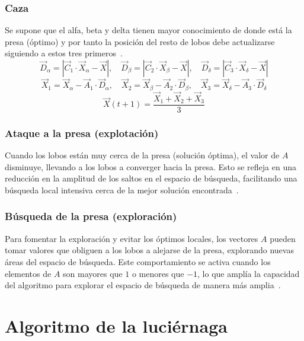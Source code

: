 \subsubsection{Caza}
Se supone que el alfa, beta y delta tienen mayor conocimiento de donde está la presa (óptimo) y por tanto la posición del resto de lobos debe actualizarse siguiendo a estos tres primeros~\cite{mirjalili_grey_2014}.
\begin{equation}
    \vec{D}_{\alpha}=|\vec{C}_1\cdot\vec{X}_{\alpha}-\vec{X}|,\quad \vec{D}_{\beta}=|\vec{C}_2\cdot\vec{X}_{\beta}-\vec{X}|,\quad \vec{D}_{\delta}=|\vec{C}_3\cdot\vec{X}_{\delta}-\vec{X}|
\end{equation}
\begin{equation}
    \vec{X}_1=\vec{X}_{\alpha}-\vec{A}_1\cdot\vec{D}_{\alpha},\quad \vec{X}_2=\vec{X}_{\beta}-\vec{A}_2\cdot\vec{D}_{\beta},\quad \vec{X}_3=\vec{X}_{\delta}-\vec{A}_3\cdot\vec{D}_{\delta}
\end{equation}
\begin{equation}
    \vec{X}(t+1)=\frac{\vec{X}_1+\vec{X}_2+\vec{X}_3}{3}
\end{equation}

\subsubsection{Ataque a la presa (explotación)}
Cuando los lobos están muy cerca de la presa (solución óptima), el valor de $A$ disminuye, llevando a los lobos a converger hacia la presa. Esto se refleja en una reducción en la amplitud de los saltos en el espacio de búsqueda, facilitando una búsqueda local intensiva cerca de la mejor solución encontrada~\cite{mirjalili_grey_2014}.

\subsubsection{Búsqueda de la presa (exploración)}
Para fomentar la exploración y evitar los óptimos locales, los vectores $A$ pueden tomar valores que obliguen a los lobos a alejarse de la presa, explorando nuevas áreas del espacio de búsqueda. Este comportamiento se activa cuando los elementos de $A$ son mayores que $1$ o menores que $-1$, lo que amplía la capacidad del algoritmo para explorar el espacio de búsqueda de manera más amplia~\cite{mirjalili_grey_2014}.

\section{Algoritmo de la luciérnaga}
